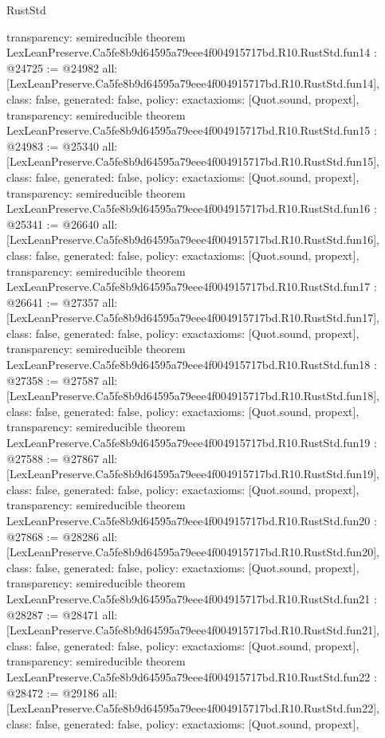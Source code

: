 \begin{lexlean}{RustStd}
\begin{coremodule}
{  transparency: semireducible
}
theorem LexLeanPreserve.Ca5fe8b9d64595a79eee4f004915717bd.R10.RustStd.fun14 : @24725 := @24982 {
  all: [LexLeanPreserve.Ca5fe8b9d64595a79eee4f004915717bd.R10.RustStd.fun14],
  class: false,
  generated: false,
  policy: exact{axioms: [Quot.sound, propext]},
  transparency: semireducible
}
theorem LexLeanPreserve.Ca5fe8b9d64595a79eee4f004915717bd.R10.RustStd.fun15 : @24983 := @25340 {
  all: [LexLeanPreserve.Ca5fe8b9d64595a79eee4f004915717bd.R10.RustStd.fun15],
  class: false,
  generated: false,
  policy: exact{axioms: [Quot.sound, propext]},
  transparency: semireducible
}
theorem LexLeanPreserve.Ca5fe8b9d64595a79eee4f004915717bd.R10.RustStd.fun16 : @25341 := @26640 {
  all: [LexLeanPreserve.Ca5fe8b9d64595a79eee4f004915717bd.R10.RustStd.fun16],
  class: false,
  generated: false,
  policy: exact{axioms: [Quot.sound, propext]},
  transparency: semireducible
}
theorem LexLeanPreserve.Ca5fe8b9d64595a79eee4f004915717bd.R10.RustStd.fun17 : @26641 := @27357 {
  all: [LexLeanPreserve.Ca5fe8b9d64595a79eee4f004915717bd.R10.RustStd.fun17],
  class: false,
  generated: false,
  policy: exact{axioms: [Quot.sound, propext]},
  transparency: semireducible
}
theorem LexLeanPreserve.Ca5fe8b9d64595a79eee4f004915717bd.R10.RustStd.fun18 : @27358 := @27587 {
  all: [LexLeanPreserve.Ca5fe8b9d64595a79eee4f004915717bd.R10.RustStd.fun18],
  class: false,
  generated: false,
  policy: exact{axioms: [Quot.sound, propext]},
  transparency: semireducible
}
theorem LexLeanPreserve.Ca5fe8b9d64595a79eee4f004915717bd.R10.RustStd.fun19 : @27588 := @27867 {
  all: [LexLeanPreserve.Ca5fe8b9d64595a79eee4f004915717bd.R10.RustStd.fun19],
  class: false,
  generated: false,
  policy: exact{axioms: [Quot.sound, propext]},
  transparency: semireducible
}
theorem LexLeanPreserve.Ca5fe8b9d64595a79eee4f004915717bd.R10.RustStd.fun20 : @27868 := @28286 {
  all: [LexLeanPreserve.Ca5fe8b9d64595a79eee4f004915717bd.R10.RustStd.fun20],
  class: false,
  generated: false,
  policy: exact{axioms: [Quot.sound, propext]},
  transparency: semireducible
}
theorem LexLeanPreserve.Ca5fe8b9d64595a79eee4f004915717bd.R10.RustStd.fun21 : @28287 := @28471 {
  all: [LexLeanPreserve.Ca5fe8b9d64595a79eee4f004915717bd.R10.RustStd.fun21],
  class: false,
  generated: false,
  policy: exact{axioms: [Quot.sound, propext]},
  transparency: semireducible
}
theorem LexLeanPreserve.Ca5fe8b9d64595a79eee4f004915717bd.R10.RustStd.fun22 : @28472 := @29186 {
  all: [LexLeanPreserve.Ca5fe8b9d64595a79eee4f004915717bd.R10.RustStd.fun22],
  class: false,
  generated: false,
  policy: exact{axioms: [Quot.sound, propext]},
}
\end{coremodule}
\end{lexlean}

